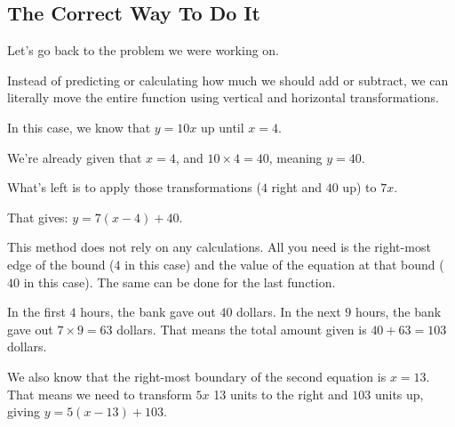 \subsection{The Correct Way To Do It}
Let's go back to the problem we were working on.

Instead of predicting or calculating how much we should add or subtract, we can literally move the entire function using vertical and horizontal transformations. 

In this case, we know that $y = 10x$ up until $x = 4$.

We're already given that $x = 4$, and $10 \times 4 = 40$, meaning $y = 40$.

What's left is to apply those transformations ($4$ right and $40$ up) to $7x$.

That gives: $y = 7(x - 4) + 40$.

This method does not rely on any calculations. All you need is the right-most edge of the bound ($4$ in this case) and the value of the equation at that bound ($40$ in this case). The same can be done for the last function.

In the first $4$ hours, the bank gave out $40$ dollars. In the next $9$ hours, the bank gave out $7 \times 9 = 63$ dollars. That means the total amount given is $40 + 63 = 103$ dollars.

We also know that the right-most boundary of the second equation is $x = 13$. That means we need to transform $5x$ 13 units to the right and $103$ units up, giving $y = 5(x - 13) + 103$.

